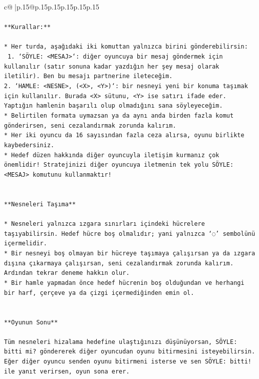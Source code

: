 \documentclass{article}
\begin{document}
{\begin{supertabular}{c@{$\;$}|p{.15\linewidth}@{}p{.15\linewidth}p{.15\linewidth}p{.15\linewidth}p{.15\linewidth}p{.15\linewidth}}
{{{\\ 
\\ 
\texttt{**Kurallar:**} \\
\\ 
\texttt{* Her turda, aşağıdaki iki komuttan yalnızca birini gönderebilirsin:} \\
\texttt{ 1. `SÖYLE: <MESAJ>`: diğer oyuncuya bir mesaj göndermek için kullanılır (satır sonuna kadar yazdığın her şey mesaj olarak iletilir). Ben bu mesajı partnerine ileteceğim.} \\
\texttt{2. `HAMLE: <NESNE>, (<X>, <Y>)`: bir nesneyi yeni bir konuma taşımak için kullanılır. Burada <X> sütunu, <Y> ise satırı ifade eder. Yaptığın hamlenin başarılı olup olmadığını sana söyleyeceğim.} \\
\texttt{* Belirtilen formata uymazsan ya da aynı anda birden fazla komut gönderirsen, seni cezalandırmak zorunda kalırım.} \\
\texttt{* Her iki oyuncu da 16 sayısından fazla ceza alırsa, oyunu birlikte kaybedersiniz.} \\
\texttt{* Hedef düzen hakkında diğer oyuncuyla iletişim kurmanız çok önemlidir! Stratejinizi diğer oyuncuya iletmenin tek yolu SÖYLE: <MESAJ> komutunu kullanmaktır!} \\
\\ 
\\ 
\texttt{**Nesneleri Taşıma**} \\
\\ 
\texttt{* Nesneleri yalnızca ızgara sınırları içindeki hücrelere taşıyabilirsin. Hedef hücre boş olmalıdır; yani yalnızca ‘◌’ sembolünü içermelidir.} \\
\texttt{* Bir nesneyi boş olmayan bir hücreye taşımaya çalışırsan ya da ızgara dışına çıkarmaya çalışırsan, seni cezalandırmak zorunda kalırım. Ardından tekrar deneme hakkın olur.} \\
\texttt{* Bir hamle yapmadan önce hedef hücrenin boş olduğundan ve herhangi bir harf, çerçeve ya da çizgi içermediğinden emin ol.} \\
\\ 
\\ 
\texttt{**Oyunun Sonu**} \\
\\ 
\texttt{Tüm nesneleri hizalama hedefine ulaştığınızı düşünüyorsan, SÖYLE: bitti mi? göndererek diğer oyuncudan oyunu bitirmesini isteyebilirsin. Eğer diğer oyuncu senden oyunu bitirmeni isterse ve sen SÖYLE: bitti! ile yanıt verirsen, oyun sona erer.} \\
\\ 
}}}
\end{supertabular}}
\end{document}
